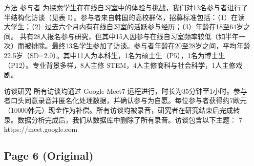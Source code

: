 \documentclass[12pt]{ctexart}
\begin{document}
方法
参与者
为探索学生在在线自习室中的体验与挑战，我们对13名参与者进行了半结构化访谈（见表 I）。参与者来自韩国的高校群体，招募标准包括：（1）在读大学生；（2）过去六个月内有在线自习室的活跃参与经历；（3）年龄在18至64岁之间。
共有28人报名参与研究，但其中15人因参与在线自习室频率较低（如半年一次）而被排除。最终13名学生参加了访谈。参与者年龄在20至28岁之间，平均年龄22.5岁（SD=2.0）。其中11人为本科生，1名为硕士生（P5），1名为博士生（P12）。专业背景多样，8人主修 STEM，4人主修商科与社会科学，1人主修戏剧。

访谈研究
所有访谈均通过 Google Meet7 远程进行，时长为35分钟至1小时。参与者口头同意录音并匿名化处理数据，并确认参与为自愿。每位参与者获得约7欧元（10000韩元）现金作为补偿。所有访谈均被录音，研究者在研究结束后完成转录。数据分析完成后，我们从数据库中删除了所有录音。访谈包含以下主题：
7 https://meet.google.com

\subsection*{Page 6 (Original)}
\end{document}
